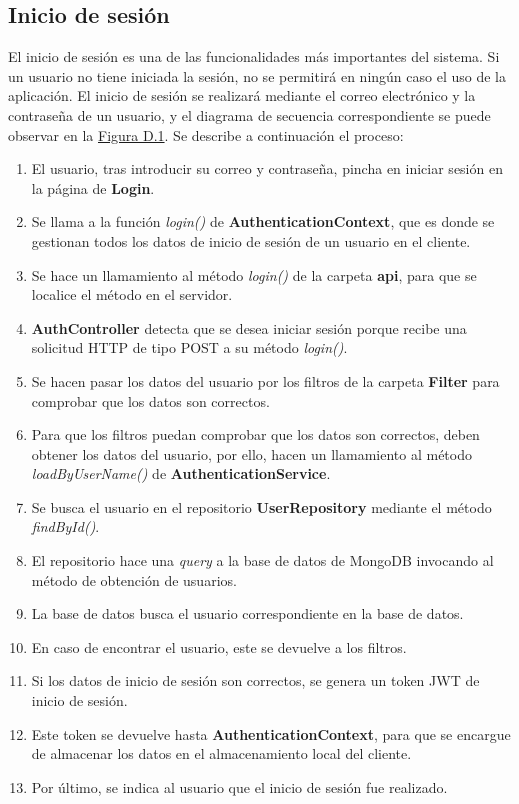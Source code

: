 \subsection{Inicio de sesión}

El inicio de sesión es una de las funcionalidades más importantes del sistema. Si un usuario no tiene iniciada la sesión, no se permitirá en ningún caso el uso de la aplicación. El inicio de sesión se realizará mediante el correo electrónico y la contraseña de un usuario, y el diagrama de secuencia correspondiente se puede observar en la \hyperref[enlaceDInicioSesion]{Figura D.1}. Se describe a continuación el proceso:

\begin{enumerate}
    \item El usuario, tras introducir su correo y contraseña, pincha en iniciar sesión en la página de {\bf Login}.
    \item Se llama a la función {\it login()} de {\bf AuthenticationContext}, que es donde se gestionan todos los datos de inicio de sesión de un usuario en el cliente.
    \item Se hace un llamamiento al método {\it login()} de la carpeta {\bf api}, para que se localice el método en el servidor.
    \item {\bf AuthController} detecta que se desea iniciar sesión porque recibe una solicitud HTTP de tipo POST a su método {\it login()}.
    \item Se hacen pasar los datos del usuario por los filtros de la carpeta {\bf Filter} para comprobar que los datos son correctos.
    \item Para que los filtros puedan comprobar que los datos son correctos, deben obtener los datos del usuario, por ello, hacen un llamamiento al método {\it loadByUserName()} de {\bf AuthenticationService}.
    \item Se busca el usuario en el repositorio {\bf UserRepository} mediante el método {\it findById()}.
    \item El repositorio hace una {\it query} a la base de datos de MongoDB invocando al método de obtención de usuarios.
    \item La base de datos busca el usuario correspondiente en la base de datos.
    \item En caso de encontrar el usuario, este se devuelve a los filtros.
    \item Si los datos de inicio de sesión son correctos, se genera un token JWT de inicio de sesión.
    \item Este token se devuelve hasta {\bf AuthenticationContext}, para que se encargue de almacenar los datos en el almacenamiento local del cliente.
    \item Por último, se indica al usuario que el inicio de sesión fue realizado.
\end{enumerate}